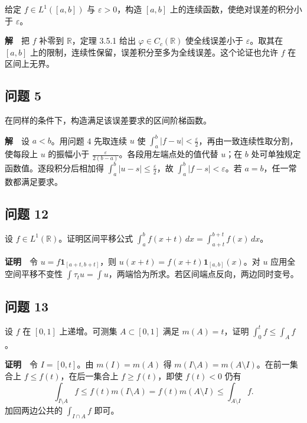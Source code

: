 \documentclass[11pt,a4paper]{article}
\begin{document}
给定 \(f\in L^1([a,b])\) 与 \(\varepsilon>0\)，构造 \([a,b]\)
上的连续函数，使绝对误差的积分小于 \(\varepsilon\)。

\textbf{解}　把 \(f\) 补零到 \(\mathbb R\)，定理 3.5.1 给出
\(\varphi\in C_c(\mathbb R)\) 使全线误差小于 \(\varepsilon\)。取其在
\([a,b]\) 上的限制，连续性保留，误差积分至多为全线误差。这个论证也允许
\(f\) 在区间上无界。

\subsection{问题 5}\label{ux95eeux9898-5}

在同样的条件下，构造满足该误差要求的区间阶梯函数。

\textbf{解}　设 \(a<b\)。用问题 4 先取连续 \(u\) 使
\(\int_a^b|f-u|<\frac{\varepsilon}{2}\)，再由一致连续性取分割，使每段上
\(u\) 的振幅小于 \(\frac{\varepsilon}{2(b-a)}\)。各段用左端点处的值代替
\(u\)；在 \(b\) 处可单独规定函数值。逐段积分后相加得
\(\int_a^b|u-s|\le\frac{\varepsilon}{2}\)，故
\(\int_a^b|f-s|<\varepsilon\)。若 \(a=b\)，任一常数都满足要求。

\subsection{问题 12}\label{ux95eeux9898-12}

设 \(f\in L^1(\mathbb R)\)。证明区间平移公式
\(\int_a^b f(x+t)\,dx=\int_{a+t}^{b+t} f(x)\,dx\)。

\textbf{证明}　令 \(u=f\mathbf1_{[a+t,b+t]}\)，则
\(u(x+t)=f(x+t)\mathbf1_{[a,b]}(x)\)。对 \(u\) 应用全空间平移不变性
\(\int\tau_tu=\int u\)，两端恰为所求。若区间端点反向，两边同时变号。

\subsection{问题 13}\label{ux95eeux9898-13}

设 \(f\) 在 \([0,1]\) 上递增。可测集 \(A\subset[0,1]\) 满足
\(m(A)=t\)，证明 \(\int_0^t f\le\int_A f\)。

\textbf{证明}　令 \(I=[0,t]\)。由 \(m(I)=m(A)\) 得
\(m(I\setminus A)=m(A\setminus I)\)。在前一集合上
\(f\le f(t)\)，在后一集合上 \(f\ge f(t)\)，即使 \(f(t)<0\) 仍有 \begin{equation*}
\int_{I\setminus A} f\le f(t)m(I\setminus A)
=f(t)m(A\setminus I)\le\int_{A\setminus I}f .
\end{equation*} 加回两边公共的 \(\int_{I\cap A}f\) 即可。
\end{document}
